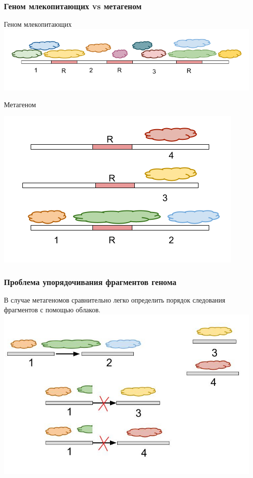 \documentclass[12pt,pdf,hyperref={unicode}]{beamer}
\begin{document}
\begin{frame}
\frametitle{Геном млекопитающих vs метагеном}

Геном млекопитающих
\center
\includegraphics[scale=0.37]{human.png}
\begin{flushleft}
Метагеном
\end{flushleft}

\includegraphics[scale=0.4]{metagenom.png}
\end{frame}

\begin{frame}
\frametitle{Проблема упорядочивания фрагментов генома}
В случае метагеномов сравнительно легко определить порядок следования фрагментов с помощью облаков.
\center
\includegraphics[scale=0.35]{easy.jpg}
\end{frame}
\end{document}

